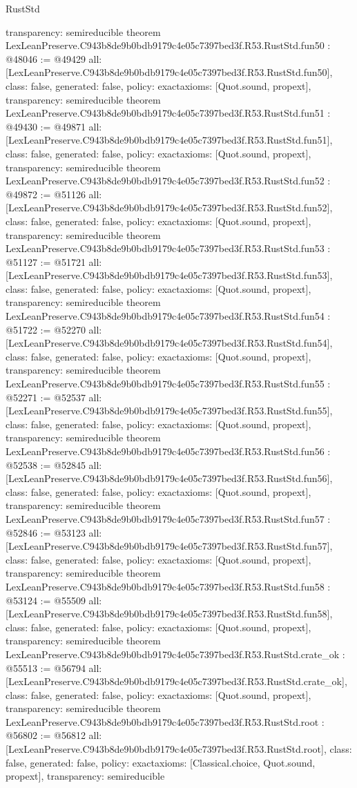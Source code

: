 \begin{lexlean}{RustStd}
\begin{coremodule}
{  transparency: semireducible
}
theorem LexLeanPreserve.C943b8de9b0bdb9179c4e05c7397bed3f.R53.RustStd.fun50 : @48046 := @49429 {
  all: [LexLeanPreserve.C943b8de9b0bdb9179c4e05c7397bed3f.R53.RustStd.fun50],
  class: false,
  generated: false,
  policy: exact{axioms: [Quot.sound, propext]},
  transparency: semireducible
}
theorem LexLeanPreserve.C943b8de9b0bdb9179c4e05c7397bed3f.R53.RustStd.fun51 : @49430 := @49871 {
  all: [LexLeanPreserve.C943b8de9b0bdb9179c4e05c7397bed3f.R53.RustStd.fun51],
  class: false,
  generated: false,
  policy: exact{axioms: [Quot.sound, propext]},
  transparency: semireducible
}
theorem LexLeanPreserve.C943b8de9b0bdb9179c4e05c7397bed3f.R53.RustStd.fun52 : @49872 := @51126 {
  all: [LexLeanPreserve.C943b8de9b0bdb9179c4e05c7397bed3f.R53.RustStd.fun52],
  class: false,
  generated: false,
  policy: exact{axioms: [Quot.sound, propext]},
  transparency: semireducible
}
theorem LexLeanPreserve.C943b8de9b0bdb9179c4e05c7397bed3f.R53.RustStd.fun53 : @51127 := @51721 {
  all: [LexLeanPreserve.C943b8de9b0bdb9179c4e05c7397bed3f.R53.RustStd.fun53],
  class: false,
  generated: false,
  policy: exact{axioms: [Quot.sound, propext]},
  transparency: semireducible
}
theorem LexLeanPreserve.C943b8de9b0bdb9179c4e05c7397bed3f.R53.RustStd.fun54 : @51722 := @52270 {
  all: [LexLeanPreserve.C943b8de9b0bdb9179c4e05c7397bed3f.R53.RustStd.fun54],
  class: false,
  generated: false,
  policy: exact{axioms: [Quot.sound, propext]},
  transparency: semireducible
}
theorem LexLeanPreserve.C943b8de9b0bdb9179c4e05c7397bed3f.R53.RustStd.fun55 : @52271 := @52537 {
  all: [LexLeanPreserve.C943b8de9b0bdb9179c4e05c7397bed3f.R53.RustStd.fun55],
  class: false,
  generated: false,
  policy: exact{axioms: [Quot.sound, propext]},
  transparency: semireducible
}
theorem LexLeanPreserve.C943b8de9b0bdb9179c4e05c7397bed3f.R53.RustStd.fun56 : @52538 := @52845 {
  all: [LexLeanPreserve.C943b8de9b0bdb9179c4e05c7397bed3f.R53.RustStd.fun56],
  class: false,
  generated: false,
  policy: exact{axioms: [Quot.sound, propext]},
  transparency: semireducible
}
theorem LexLeanPreserve.C943b8de9b0bdb9179c4e05c7397bed3f.R53.RustStd.fun57 : @52846 := @53123 {
  all: [LexLeanPreserve.C943b8de9b0bdb9179c4e05c7397bed3f.R53.RustStd.fun57],
  class: false,
  generated: false,
  policy: exact{axioms: [Quot.sound, propext]},
  transparency: semireducible
}
theorem LexLeanPreserve.C943b8de9b0bdb9179c4e05c7397bed3f.R53.RustStd.fun58 : @53124 := @55509 {
  all: [LexLeanPreserve.C943b8de9b0bdb9179c4e05c7397bed3f.R53.RustStd.fun58],
  class: false,
  generated: false,
  policy: exact{axioms: [Quot.sound, propext]},
  transparency: semireducible
}
theorem LexLeanPreserve.C943b8de9b0bdb9179c4e05c7397bed3f.R53.RustStd.crate_ok : @55513 := @56794 {
  all: [LexLeanPreserve.C943b8de9b0bdb9179c4e05c7397bed3f.R53.RustStd.crate_ok],
  class: false,
  generated: false,
  policy: exact{axioms: [Quot.sound, propext]},
  transparency: semireducible
}
theorem LexLeanPreserve.C943b8de9b0bdb9179c4e05c7397bed3f.R53.RustStd.root : @56802 := @56812 {
  all: [LexLeanPreserve.C943b8de9b0bdb9179c4e05c7397bed3f.R53.RustStd.root],
  class: false,
  generated: false,
  policy: exact{axioms: [Classical.choice, Quot.sound, propext]},
  transparency: semireducible
}


\end{coremodule}
\end{lexlean}
